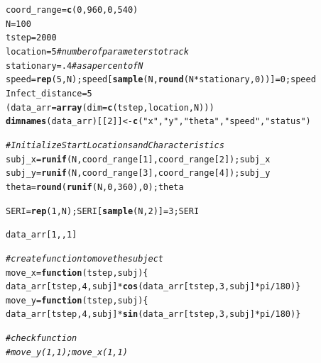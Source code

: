 \documentclass{article}\usepackage[]{graphicx}\usepackage[]{color}
\makeatletter
\newcommand{\hlnum}[1]{\textcolor[rgb]{0.686,0.059,0.569}{#1}}%
\newcommand{\hlstr}[1]{\textcolor[rgb]{0.192,0.494,0.8}{#1}}%
\newcommand{\hlcom}[1]{\textcolor[rgb]{0.678,0.584,0.686}{\textit{#1}}}%
\newcommand{\hlopt}[1]{\textcolor[rgb]{0,0,0}{#1}}%
\newcommand{\hlstd}[1]{\textcolor[rgb]{0.345,0.345,0.345}{#1}}%
\newcommand{\hlkwa}[1]{\textcolor[rgb]{0.161,0.373,0.58}{\textbf{#1}}}%
\newcommand{\hlkwb}[1]{\textcolor[rgb]{0.69,0.353,0.396}{#1}}%
\newcommand{\hlkwc}[1]{\textcolor[rgb]{0.333,0.667,0.333}{#1}}%
\newcommand{\hlkwd}[1]{\textcolor[rgb]{0.737,0.353,0.396}{\textbf{#1}}}%
\newenvironment{kframe}{%
 \def\at@end@of@kframe{}%
 \ifinner\ifhmode%
  \def\at@end@of@kframe{\end{minipage}}%
  \begin{minipage}{\columnwidth}%
 \fi\fi%
 \def\FrameCommand##1{\hskip\@totalleftmargin \hskip-\fboxsep
 \colorbox{shadecolor}{##1}\hskip-\fboxsep
     \hskip-\linewidth \hskip-\@totalleftmargin \hskip\columnwidth}%
 \MakeFramed {\advance\hsize-\width
   \@totalleftmargin\z@ \linewidth\hsize
   \@setminipage}}%
 {\par\unskip\endMakeFramed%
 \at@end@of@kframe}
\newenvironment{knitrout}{}{} %
\makeatother
\begin{document}
\begin{knitrout}
\color{fgcolor}\begin{kframe}
\begin{alltt}
\hlstd{coord_range} \hlkwb{=} \hlkwd{c}\hlstd{(}\hlnum{0}\hlstd{,} \hlnum{960}\hlstd{,} \hlnum{0}\hlstd{,} \hlnum{540}\hlstd{)}
\hlstd{N} \hlkwb{=} \hlnum{100}
\hlstd{tstep} \hlkwb{=} \hlnum{2000}
\hlstd{location} \hlkwb{=} \hlnum{5} \hlcom{# number of parameters to track}
\hlstd{stationary} \hlkwb{=} \hlnum{.4} \hlcom{# as a percent of N}
\hlstd{speed} \hlkwb{=} \hlkwd{rep}\hlstd{(}\hlnum{5}\hlstd{,N); speed[}\hlkwd{sample}\hlstd{(N,} \hlkwd{round}\hlstd{(N}\hlopt{*}\hlstd{stationary,} \hlnum{0}\hlstd{))]}\hlkwb{=}\hlnum{0}\hlstd{; speed}
\hlstd{Infect_distance} \hlkwb{=} \hlnum{5}
\hlstd{(data_arr} \hlkwb{=} \hlkwd{array}\hlstd{(}\hlkwc{dim}\hlstd{=}\hlkwd{c}\hlstd{(tstep,location, N)))}
\hlkwd{dimnames}\hlstd{(data_arr)[[}\hlnum{2}\hlstd{]]} \hlkwb{<-} \hlkwd{c}\hlstd{(}\hlstr{"x"}\hlstd{,} \hlstr{"y"}\hlstd{,} \hlstr{"theta"}\hlstd{,} \hlstr{"speed"}\hlstd{,} \hlstr{"status"}\hlstd{)}

\hlcom{# Initialize Start Locations and Characteristics}
\hlstd{subj_x} \hlkwb{=} \hlkwd{runif}\hlstd{(N, coord_range[}\hlnum{1}\hlstd{],  coord_range[}\hlnum{2}\hlstd{]); subj_x}
\hlstd{subj_y} \hlkwb{=} \hlkwd{runif}\hlstd{(N, coord_range[}\hlnum{3}\hlstd{],  coord_range[}\hlnum{4}\hlstd{]); subj_y}
\hlstd{theta} \hlkwb{=} \hlkwd{round}\hlstd{(}\hlkwd{runif}\hlstd{(N,} \hlnum{0}\hlstd{,} \hlnum{360}\hlstd{),}\hlnum{0}\hlstd{); theta}

\hlstd{SERI} \hlkwb{=} \hlkwd{rep}\hlstd{(}\hlnum{1}\hlstd{, N); SERI[}\hlkwd{sample}\hlstd{(N,} \hlnum{2}\hlstd{)]} \hlkwb{=} \hlnum{3}\hlstd{; SERI}

\hlstd{data_arr[}\hlnum{1}\hlstd{,,}\hlnum{1}\hlstd{]}

\hlcom{#create function to move the subject}
\hlstd{move_x} \hlkwb{=} \hlkwa{function}\hlstd{(}\hlkwc{tstep}\hlstd{,} \hlkwc{subj}\hlstd{)\{}
\hlstd{data_arr[tstep,} \hlnum{4}\hlstd{, subj]} \hlopt{*} \hlkwd{cos}\hlstd{(data_arr[tstep,}\hlnum{3}\hlstd{, subj]}\hlopt{*}\hlstd{pi}\hlopt{/}\hlnum{180}\hlstd{)\}}
\hlstd{move_y} \hlkwb{=} \hlkwa{function}\hlstd{(}\hlkwc{tstep}\hlstd{,} \hlkwc{subj}\hlstd{)\{}
\hlstd{data_arr[tstep,} \hlnum{4}\hlstd{, subj]} \hlopt{*} \hlkwd{sin}\hlstd{(data_arr[tstep,}\hlnum{3}\hlstd{, subj]}\hlopt{*}\hlstd{pi}\hlopt{/}\hlnum{180}\hlstd{)\}}

\hlcom{# check function }
\hlcom{# move_y(1, 1); move_x(1,1)}


\end{alltt}
\end{kframe}
\end{knitrout}
\end{document}

